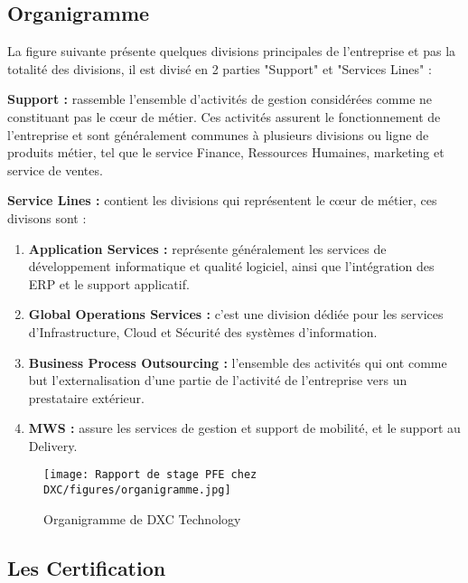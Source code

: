 \newpage
\subsection{Organigramme }
La figure suivante présente quelques divisions principales de l’entreprise et pas la totalité
des divisions, il est divisé en 2 parties "Support" et "Services Lines" :

\begin{description}
  \item \textbf{Support :} rassemble l’ensemble d'activités de gestion considérées comme ne constituant pas le cœur de métier. Ces activités assurent le fonctionnement de l'entreprise et sont généralement communes à plusieurs divisions ou ligne de produits métier, tel que le service Finance, Ressources Humaines, marketing et service de ventes.
  \item \textbf{Service Lines :} contient les divisions qui représentent le cœur de métier, ces divisons
 sont :
 \begin{enumerate}
   \item \textbf{Application Services :} représente généralement les services de développement informatique et qualité logiciel, ainsi que l’intégration des ERP et le support applicatif.
   \item \textbf{Global Operations Services :} c’est une division dédiée pour les services d’Infrastructure, Cloud et Sécurité des systèmes d’information.
   \item \textbf{Business Process Outsourcing : } l’ensemble des activités qui ont comme but l'externalisation d'une partie de l'activité de l'entreprise vers un prestataire extérieur.
    \item \textbf{MWS  : } assure les services de gestion et support de mobilité, et le support au Delivery.
 \end{enumerate}
  
  \begin{figure}[!h]
    \centering
    \texttt{[image: Rapport de stage PFE chez DXC/figures/organigramme.jpg]}
    \caption{Organigramme de DXC Technology}
\end{figure}
  
\end{description}

\subsection{Les Certification }

